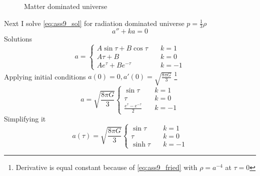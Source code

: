 %
\begin{figure}[H]
    \centering
    \caption{Matter dominated universe}
\end{figure}
%
Next I solve \cref{eq:ass9_sol} for radiation dominated universe
$p=\frac{1}{3}\rho$
%
\begin{equation}
    a'' + ka = 0
\end{equation}
%
Solutions
%
\begin{equation}
    a = \begin{cases}
        A \sin \tau + B\cos\tau & \quad k=1  \\
        A\tau + B               & \quad k=0  \\
        A e^{\tau} + Be^{-\tau} & \quad k=-1
    \end{cases}
\end{equation}
%
Applying initial conditions $a(0)=0, a'(0)=\sqrt{\frac{8\pi G}{3}}$
\footnote{Derivative is equal constant because of \cref{eq:ass9_fried} with
    $\rho = a^{-4}$ at $\tau = 0$}
%
\begin{equation}
    a = \sqrt{\frac{8\pi G}{3}}
    \begin{cases}
        \sin\tau                       & \quad k=1  \\
        \tau                           & \quad k=0  \\
        \frac{e^{\tau} - e^{-\tau}}{2} & \quad k=-1
    \end{cases}
\end{equation}
%
Simplifying it
%
\begin{equation}
    \boxed{a(\tau) = \sqrt{\frac{8\pi G}{3}}
        \begin{cases}
            \sin\tau   & \quad k=1  \\
            \tau       & \quad k=0  \\
            \sinh \tau & \quad k=-1
        \end{cases}}
\end{equation}

